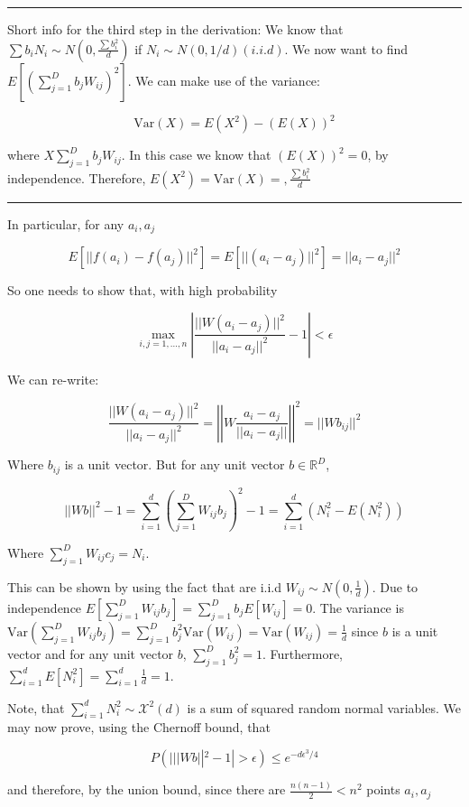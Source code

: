 \documentclass[12pt, authoryear]{elsarticle}
\begin{document}
\noindent\rule[0.5ex]{\linewidth}{1pt}
Short info for the third step in the derivation:
We know that $\sum b_i N_i \sim N(0,\frac{\sum b_i^2}{d})$ if $N_i \sim N(0,1/d) (i.i.d) $. We now want to find $E[(\sum_{j=1}^D b_j W_{ij})^2]$. We can make use of the variance: 

$$ \text{Var}(X) = E(X^2) - (E(X))^2 $$

where $ X\sum_{j=1}^D b_j W_{ij}$. In this case we know that $(E(X))^2 = 0 $, by independence. Therefore, $E(X^2) = \text{Var}(X) = ,\frac{\sum b_i^2}{d}$

\noindent\rule[0.5ex]{\linewidth}{1pt}

In particular, for any $a_i,a_j$

$$E[||f(a_i) - f(a_j)||^2] = E[||(a_i - a_j) ||^2] = ||a_i -a_j||^2$$

So one needs to show that, with high probability 

$$ \max_{i,j = 1,...,n} \left|\frac{||W(a_i-a_j)||^2}{||a_i -a_j||^2} -1\right| < \epsilon$$

We can re-write: 

$$\frac{|| W(a_i -a_j)||^2}{||a_i -a_j||^2} = \left|\left|W\frac{a_i-a_j}{||a_i-a_j||}\right|\right|^2 = ||Wb_{ij}||^2$$

Where $b_{ij}$ is a unit vector. But for any unit vector $b \in \mathbb{R}^D$,

$$ ||Wb||^2 -1 = \sum_{i=1}^d(\sum_{j=1}^D W_{ij}b_j)^2 -1 = \sum_{i=1}^d(N_i^2-E(N_i^2))$$

Where $\sum _ { j = 1 } ^ { D } W _ { i j } c _ { j } = N _ { i }$.

This can be shown by using the fact that are i.i.d $W_{ij} \sim N(0,\frac{1}{d})$. Due to independence $E[\sum_{j=1}^D W_{ij}b_j] =  \sum_{j=1}^D b_j E[W_{ij}] = 0$. The variance is $\text{Var}(\sum_{j=1}^D W_{ij}b_j) = \sum_{j=1}^D b_j^2 \text{Var}(W_{ij}) = \text{Var}(W_{ij}) = \frac{1}{d}$ since $b$ is a unit vector and for any unit vector $b$, $\sum_{j=1}^D b_j^2 = 1$. Furthermore, $\sum_{i=1}^dE[N_i^2] = \sum_{i=1}^d \frac{1}{d}= 1$. 


Note, that $\sum _ { i = 1 } ^ { d } N _ { i } ^ { 2 } \sim \mathcal { X } ^ { 2 } ( d )$ is a sum of squared random normal variables. We may now prove, using the Chernoff bound, that 

$$P (| ||Wb||^2 -1 | > \epsilon) \leq e^{-d \epsilon^3 / 4}$$

and therefore, by the union bound, since there are $\frac{n(n-1)}{2} < n^2$ points $a_i,a_j$
\end{document}
